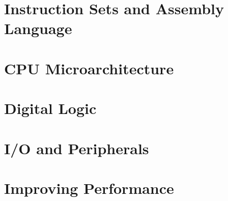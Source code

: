 \documentclass{article}
\begin{document}
	\section{Instruction Sets and Assembly Language}
	
	\section{CPU Microarchitecture}
	
	\section{Digital Logic}
	
	\section{I/O and Peripherals}
	
	\section{Improving Performance}
	
	\newpage
	\listoffigures
	\printindex	
\end{document}
